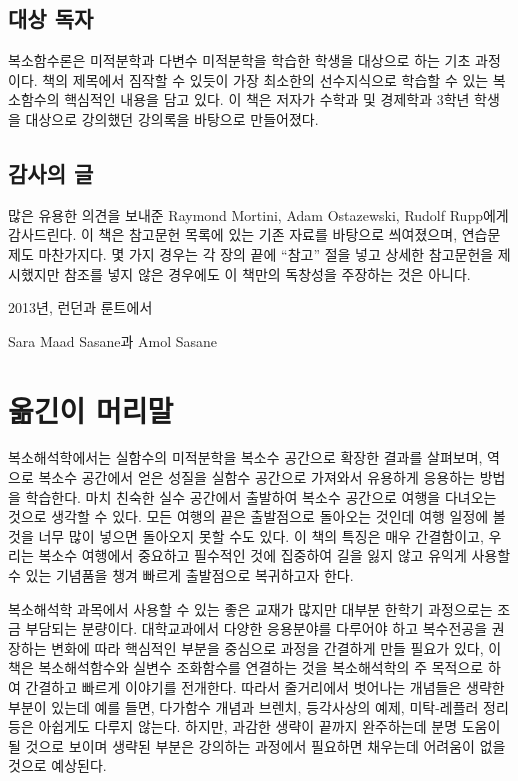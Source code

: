 \section*{대상 독자}

복소함수론은 미적분학과 다변수 미적분학을 학습한 학생을 대상으로 하는 기초 과정이다.
책의 제목에서 짐작할 수 있듯이
가장 최소한의 선수지식으로 학습할 수 있는 복소함수의 핵심적인 내용을 담고 있다.
이 책은 저자가 수학과 및 경제학과 3학년 학생을 대상으로 강의했던 강의록을 
바탕으로  만들어졌다.


\section*{감사의 글}

 많은 유용한 의견을 보내준 
Raymond Mortini, Adam Ostazewski, Rudolf Rupp에게 감사드린다.
이 책은 참고문헌 목록에 있는 기존 자료를 바탕으로 씌여졌으며, %
연습문제도 마찬가지다.
몇 가지 경우는 각 장의 끝에 ``참고'' 절을 넣고 상세한 참고문헌을 제시했지만
참조를 넣지 않은 경우에도 이 책만의 독창성을 주장하는 것은 아니다.

\begin{flushright}
2013년, 런던과 룬트에서

Sara Maad Sasane과 Amol Sasane
\end{flushright}

\clearpage

\chapter*[옮긴이 머리말]{옮긴이 머리말}



복소해석학에서는 실함수의 미적분학을 
복소수 공간으로 확장한 결과를 살펴보며,
역으로 복소수 공간에서 얻은 성질을 
실함수 공간으로 가져와서 유용하게 응용하는 방법을 학습한다. 
마치 친숙한 실수 공간에서 출발하여
복소수 공간으로 여행을 다녀오는 것으로 생각할 수 있다.
모든 여행의 끝은 출발점으로 돌아오는 것인데
여행 일정에 	볼 것을 너무 많이 넣으면  돌아오지 못할 수도 있다.
이 책의 특징은 매우 간결함이고, 우리는 복소수 여행에서
중요하고 필수적인 것에 집중하여
길을 잃지 않고 유익게 사용할 수 있는 기념품을 챙겨 빠르게 출발점으로 복귀하고자 한다.


복소해석학 과목에서 사용할 수 있는 좋은 교재가 많지만
대부분 한학기 과정으로는 조금 부담되는 분량이다. 
대학교과에서 다양한 응용분야를 다루어야 하고 
복수전공을 권장하는 변화에 따라 핵심적인 부분을 중심으로 과정을 간결하게 만들 필요가 있다,
이 책은 복소해석함수와 실변수 조화함수를 연결하는 것을
복소해석학의 주 목적으로 하여 간결하고 빠르게 이야기를 전개한다.
따라서 줄거리에서 벗어나는 개념들은 생략한 부분이 있는데
예를 들면, 다가함수 개념과 브렌치, 등각사상의 예제, 미탁-레플러 정리 등은
아쉽게도 다루지 않는다.
하지만, 과감한 생략이 끝까지 완주하는데 분명 도움이 될 것으로 보이며
생략된 부분은 강의하는 과정에서 필요하면 채우는데 어려움이 없을 것으로 예상된다.

